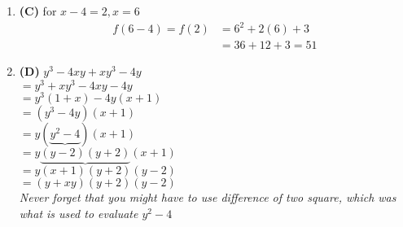 \begin{multicols}{2}
\begin{enumerate}[label={\textbf{\arabic*.}}]
    \item \textbf{(C)} for $x - 4 = 2, x = 6$ 
    \begin{align*} 
        f(6 - 4 ) = f(2) &= 6^2 + 2(6) + 3 \\
        & = 36 + 12 + 3  = 51
    \end{align*}

    \item \textbf{(D)} $y^3 - 4xy + xy^3 - 4y$ \\
     $= y^3 + xy^3 - 4xy - 4y$ \\
        $= y^3(1 + x) -4y (x + 1)$ \\
        $= (y^3 -4y)(x + 1)$ \\
        $= y(\underbrace{y^2 -4})(x+1)$ \\
        $= y\underbrace{(y-2)(y+2)}(x+1)$ \\
        $= y(x+1)(y+2)(y-2)$ \\
        $= (y + xy)(y+2)(y-2)$ \\
    \textit{Never forget that you might have to use difference of two square, which was what is used to evaluate $y^2 -4$}


\end{enumerate}
\end{multicols}
